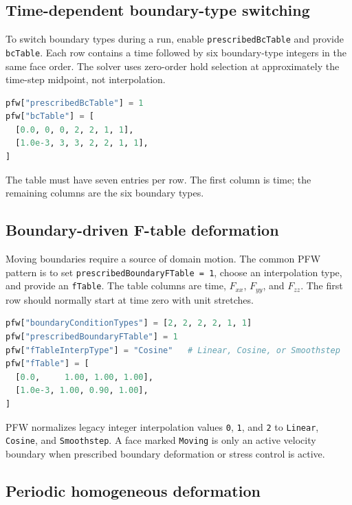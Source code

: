 \subsection{Time-dependent boundary-type switching}

To switch boundary types during a run, enable \texttt{prescribedBcTable} and provide \texttt{bcTable}.  Each row contains a time followed by six boundary-type integers in the same face order.  The solver uses zero-order hold selection at approximately the time-step midpoint, not interpolation.
\begin{lstlisting}[language=Python,caption={PFW boundary-condition table.}]
pfw["prescribedBcTable"] = 1
pfw["bcTable"] = [
  [0.0, 0, 0, 2, 2, 1, 1],
  [1.0e-3, 3, 3, 2, 2, 1, 1],
]
\end{lstlisting}
The table must have seven entries per row.  The first column is time; the remaining columns are the six boundary types.

\subsection{Boundary-driven F-table deformation}

Moving boundaries require a source of domain motion.  The common PFW pattern is to set \texttt{prescribedBoundaryFTable = 1}, choose an interpolation type, and provide an \texttt{fTable}.  The table columns are time, $F_{xx}$, $F_{yy}$, and $F_{zz}$.  The first row should normally start at time zero with unit stretches.
\begin{lstlisting}[language=Python,caption={Boundary-driven diagonal deformation history.}]
pfw["boundaryConditionTypes"] = [2, 2, 2, 2, 1, 1]
pfw["prescribedBoundaryFTable"] = 1
pfw["fTableInterpType"] = "Cosine"   # Linear, Cosine, or Smoothstep
pfw["fTable"] = [
  [0.0,     1.00, 1.00, 1.00],
  [1.0e-3, 1.00, 0.90, 1.00],
]
\end{lstlisting}
PFW normalizes legacy integer interpolation values \texttt{0}, \texttt{1}, and \texttt{2} to \texttt{Linear}, \texttt{Cosine}, and \texttt{Smoothstep}.  A face marked \texttt{Moving} is only an active velocity boundary when prescribed boundary deformation or stress control is active.

\subsection{Periodic homogeneous deformation}

